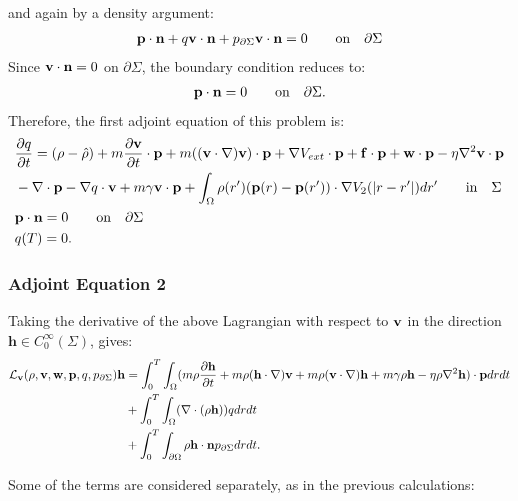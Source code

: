 and again by a density argument:
\begin{align*}
 \mathbf{p} \cdot \mathbf{n}  +  q \mathbf{v} \cdot \mathbf{n}   +{p}_{\partial \Sigma} \mathbf{v} \cdot \mathbf{n} = 0\qquad \text{on} \quad \partial \Sigma
\end{align*}
Since $\mathbf{v} \cdot \mathbf{n} =0$ on $ \partial \Sigma$, the boundary condition reduces to:
\begin{align*}
\mathbf{p} \cdot \mathbf{n} = 0 \qquad \text{on} \quad \partial \Sigma.
\end{align*}
Therefore, the first adjoint equation of this problem is:
\begin{align*}
& \frac{\partial q}{\partial t} = (\rho - \hat {\rho}) +m  \frac{\partial \mathbf{v}}{\partial t}\cdot \mathbf{p} + m ( (\mathbf{v} \cdot \nabla)\mathbf{v}) \cdot \mathbf{p}+ \nabla V_{ext}\cdot \mathbf{p} + \mathbf{f} \cdot \mathbf{p} + \mathbf{w} \cdot \mathbf{p}  - \eta \nabla^2 \mathbf{v} \cdot \mathbf{p} \\
&-\nabla\cdot \mathbf{p}  -  \nabla q \cdot \mathbf{v} + m \gamma \mathbf{v} \cdot \mathbf{p} + \int_\Omega  \rho(r')(\mathbf{p}(r) - \mathbf{p}(r')) \cdot\nabla V_2(|r-r'|)   dr' \qquad \text{in} \quad \Sigma \\
& \mathbf{p} \cdot \mathbf{n} = 0 \qquad \text{on} \quad \partial \Sigma\\
 &q(T) = {0} .
\end{align*}

\subsubsection{Adjoint Equation 2}
Taking the derivative of the above Lagrangian with respect to $\mathbf{v}$ in the direction $\mathbf{h} \in C_0^\infty(\Sigma)$, gives:
\begin{align*}
\mathcal{L}_{\mathbf{v}}(\rho,\mathbf{v},\mathbf{w},\mathbf{p},q,{p}_{\partial \Sigma})\mathbf{h} &=  \int_0^T \int_\Omega (m \rho \frac{\partial \mathbf{h} }{\partial t} + m \rho (\mathbf{h} \cdot \nabla)\mathbf{v} + m \rho (\mathbf{v} \cdot \nabla)\mathbf{h} + m \gamma \rho \mathbf{h} - \eta \rho \nabla^2 \mathbf{h}) \cdot \mathbf{p} dr dt\\
& + \int_0^T \int_\Omega ( \nabla \cdot (\rho \mathbf{h})) q dr dt\\ 
& +\int_0^T \int_{\partial\Omega} \rho \mathbf{h} \cdot \mathbf{n} {p}_{\partial \Sigma} dr dt.
\end{align*}

Some of the terms are considered separately, as in the previous calculations:

